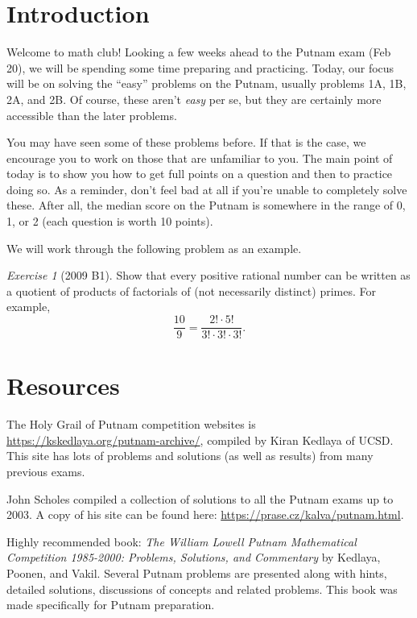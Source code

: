 \documentclass{article}
\theoremstyle{definition}
\theoremstyle{remark}
\newtheorem{exercise}{Exercise}
\begin{document}
\section{Introduction}

    Welcome to math club!
    Looking a few weeks ahead to the Putnam exam (Feb 20), we will be spending some time preparing and practicing.
    Today, our focus will be on solving the ``easy'' problems on the Putnam, usually problems 1A, 1B, 2A, and 2B.
    Of course, these aren't {\it easy} per se, but they are certainly more accessible than the later problems.
    
    You may have seen some of these problems before.
    If that is the case, we encourage you to work on those that are unfamiliar to you.
    The main point of today is to show you how to get full points on a question and then to practice doing so.
    As a reminder, don't feel bad at all if you're unable to completely solve these.
    After all, the median score on the Putnam is somewhere in the range of 0, 1, or 2 (each question is worth 10 points).
    
    We will work through the following problem as an example.
    
    \begin{exercise}[2009 B1]
        Show that every positive rational number can be written as a quotient of products of factorials of (not necessarily distinct) primes.
        For example,
        \[\frac{10}{9} = \frac{2!\cdot 5!}{3!\cdot 3!\cdot 3!}.\]
\end{exercise}

\section{Resources}

    The Holy Grail of Putnam competition websites is \url{https://kskedlaya.org/putnam-archive/}, compiled by Kiran Kedlaya of UCSD.
    This site has lots of problems and solutions (as well as results) from many previous exams.
    
    John Scholes compiled a collection of solutions to all the Putnam exams up to 2003. A copy of his site can be found here: \url{https://prase.cz/kalva/putnam.html}. 
    
    Highly recommended book: \emph{The William Lowell Putnam Mathematical Competition 1985-2000: Problems, Solutions, and Commentary} by Kedlaya, Poonen, and Vakil. Several Putnam problems are presented along with hints, detailed solutions, discussions of concepts and related problems. This book was made specifically for Putnam preparation.
\end{document}
